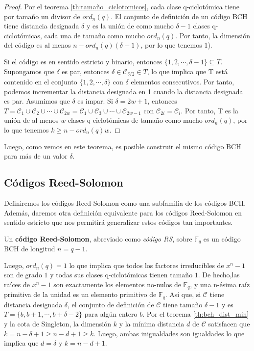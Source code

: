 \begin{proof}
Por el teorema \ref{th:tamaño_ciclotomicos}, cada clase q-ciclotómica tiene por tamaño un divisor de $ord_n(q)$. El conjunto de definición de un código BCH tiene distancia designada $\delta$ y es la unión de como mucho $\delta-1$ clases q-ciclotómicas, cada una de tamaño como mucho $ord_n(q)$. Por tanto, la dimensión del código es al menos $ n-ord_n(q)(\delta -1)$, por lo que tenemos 1). 

Si el código es en sentido estricto y binario, entonces $\{ 1,2, \cdots, \delta-1 \} \subseteq T$. Supongamos que $\delta$ es par, entonces $\delta \in \mathcal{C}_{\delta/2} \in T$, lo que implica que T está contenido en el conjunto $\{ 1,2, \cdots, \delta \}$ con $\delta$ elementos consecutivos. Por tanto, podemos incrementar la distancia designada en 1 cuando la distancia designada es par. Asumimos que $\delta$ es impar. Si $\delta = 2w+1$, entonces $ T = \mathcal{C}_1 \cup \mathcal{C}_2 \cup \cdots \cup \mathcal{C}_{2w} = \mathcal{C}_1 \cup \mathcal{C}_3 \cup \cdots \cup \mathcal{C}_{2w-1}$ con $\mathcal{C}_{2i} = \mathcal{C}_i$. Por tanto, T es la unión de al menos $w$ clases q-ciclotómicas de tamaño como mucho $ord_n(q)$, por lo que tenemos $k \geq n - ord_n(q)w$.
\end{proof}

Luego, como vemos en este teorema, es posible construir el mismo código BCH para más de un valor $\delta$.

\subsection{Códigos Reed-Solomon}

Definiremos los códigos Reed-Solomon como una subfamilia de los códigos BCH. Además, daremos otra definición equivalente para los códigos Reed-Solomon en sentido estricto que nos permitirá generalizar estos códigos tan importantes.

\begin{definition}

Un \textbf{código Reed-Solomon}, abreviado como \textit{código RS}, sobre $\mathbb{F}_q$ es un código BCH de longitud $n = q-1$. 
\end{definition}

Luego, $ord_n(q) = 1$ lo que implica que todos los factores irreducibles de $x^n-1$ son de grado $1$ y todas sus clases q-ciclotómicas tienen tamaño $1$. De hecho,las raíces de $x^n-1$ son exactamente los elementos no-nulos de $\mathbb{F}_q$, y una n-ésima raíz primitiva de la unidad es un elemento primitivo de $\mathbb{F}_q$. Así que, si $\mathcal{C}$ tiene distancia designada $\delta$, el conjunto de definición de $\mathcal{C}$ tiene tamaño $\delta-1$ y es $T = \{ b, b+1,\cdots, b+\delta-2 \}$ para algún entero $b$. Por el teorema \ref{th:bch_dist_min} y la cota de Singleton, la dimensión $k$ y la mínima distancia $d$ de $\mathcal{C}$ satisfacen que $k = n -\delta + 1 \geq n-d+1 \geq k$. Luego, ambas inigualdades son igualdades lo que implica que $ d = \delta$ y $k = n-d+1$.


